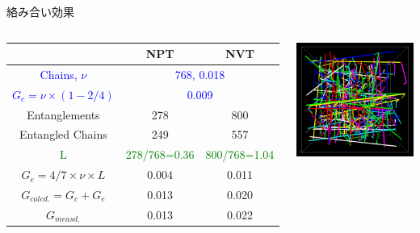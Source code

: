 \documentclass[12pt, dvipdfmx]{beamer}
\begin{document}
\begin{frame}
\begin{alertblock}{絡み合い効果}
	\end{alertblock}
	\vspace{-2mm}
	\begin{columns}[onlytextwidth]
		\scriptsize
		\begin{center}
			\begin{tabular}{c|c|c} \hline
				&NPT & NVT \\ \hline \hline
				\textcolor{blue}{Chains, $\nu$} & \multicolumn{2}{|c}{\textcolor{blue}{768, 0.018}}\\ \hline
				\textcolor{blue}{$G_c = \nu \times (1-2/4)$}&\multicolumn{2}{|c}{\textcolor{blue}{0.009}} \\ \hline \hline
				Entanglements& 278& 800\\ \hline
				Entangled Chains&249&557 \\ \hline
				\textcolor{green}{L} & \textcolor{green}{278/768=0.36} & \textcolor{green}{800/768=1.04} \\ \hline
				$G_e=4/7 \times \nu \times L $ & 0.004 & 0.011 \\ \hline \hline
				\alert{$G_{calcd.}=G_c + G_e$} & \alert{0.013} & \alert{0.020} \\ \hline \hline
				$G_{measd.}$ & 0.013 & 0.022 \\ \hline
			\end{tabular}
		\end{center}
			\centering
			\includegraphics[width=.8\textwidth]{z_cord_NPT_4Chain.png}

\end{columns}
\end{frame}
\end{document}
